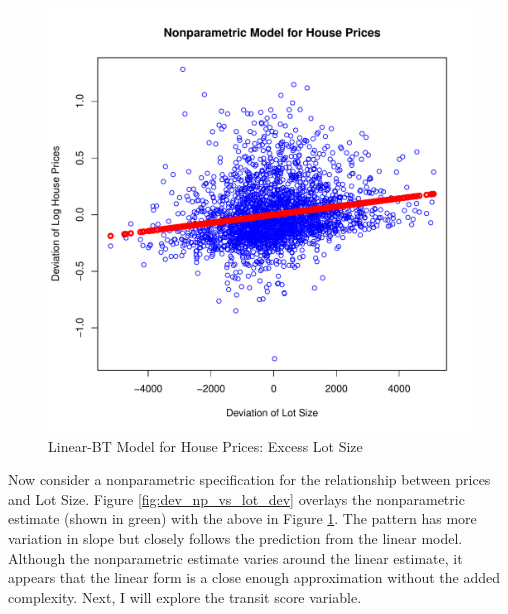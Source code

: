 \begin{figure}[h!]
  \centering
  \includegraphics[scale = 0.5, keepaspectratio=true]{../Figures/dev_vs_lot_dev}
  \caption{Linear-BT Model for House Prices: Excess Lot Size} \label{fig:dev_vs_lot_dev}
\end{figure}

\clearpage
Now consider a nonparametric specification for 
the relationship between prices and Lot Size.
Figure \ref{fig:dev_np_vs_lot_dev} 
overlays the nonparametric estimate (shown in green) with the above in 
Figure \ref{fig:dev_vs_lot_dev}.
The pattern has more variation in slope but 
closely follows the prediction from the linear model. 
Although the nonparametric estimate varies around the linear estimate,
it appears that the linear form
is a close enough approximation without the added complexity.
Next, I will explore the transit score variable.


